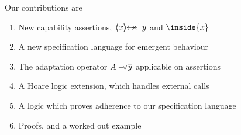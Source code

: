 Our contributions are

\begin{enumerate}
\item
New capability assertions, $\protectedFrom {x} {y}$  and $\inside{x}$ 
\item
A new specification language for emergent behaviour  
\item
The adaptation operator  $\PushAS y A$  applicable on assertions
\item
A Hoare logic extension, which handles external calls
\item
A logic which proves adherence to our specification language
\item
Proofs, and a worked out example
\end{enumerate}
